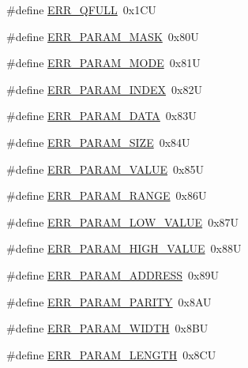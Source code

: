 \begin{DoxyCompactItemize}
\item 
\#define \hyperlink{group___p_e___error__module_gad65300b536c4165d469701d5db712cd0}{E\+R\+R\+\_\+\+Q\+F\+U\+LL}~0x1\+CU
\item 
\#define \hyperlink{group___p_e___error__module_ga970a8c8e887512534203a47758618763}{E\+R\+R\+\_\+\+P\+A\+R\+A\+M\+\_\+\+M\+A\+SK}~0x80U
\item 
\#define \hyperlink{group___p_e___error__module_ga82c14ce7730e53556eebd8522e60f7a9}{E\+R\+R\+\_\+\+P\+A\+R\+A\+M\+\_\+\+M\+O\+DE}~0x81U
\item 
\#define \hyperlink{group___p_e___error__module_ga62fe765f9a9f81fab7fda1c66f798460}{E\+R\+R\+\_\+\+P\+A\+R\+A\+M\+\_\+\+I\+N\+D\+EX}~0x82U
\item 
\#define \hyperlink{group___p_e___error__module_gaeb2f60cce36e220acadb18ae558d7fe6}{E\+R\+R\+\_\+\+P\+A\+R\+A\+M\+\_\+\+D\+A\+TA}~0x83U
\item 
\#define \hyperlink{group___p_e___error__module_ga28178b0019131081a20e071b469f8154}{E\+R\+R\+\_\+\+P\+A\+R\+A\+M\+\_\+\+S\+I\+ZE}~0x84U
\item 
\#define \hyperlink{group___p_e___error__module_gab1b9c8e3380ec0d179ca12c15376e87a}{E\+R\+R\+\_\+\+P\+A\+R\+A\+M\+\_\+\+V\+A\+L\+UE}~0x85U
\item 
\#define \hyperlink{group___p_e___error__module_ga41549ae34f9b04ae4999ea6d409e37cd}{E\+R\+R\+\_\+\+P\+A\+R\+A\+M\+\_\+\+R\+A\+N\+GE}~0x86U
\item 
\#define \hyperlink{group___p_e___error__module_gabc89752a87a9f53f321fbab8d09a8ede}{E\+R\+R\+\_\+\+P\+A\+R\+A\+M\+\_\+\+L\+O\+W\+\_\+\+V\+A\+L\+UE}~0x87U
\item 
\#define \hyperlink{group___p_e___error__module_ga9229f7ed87a3c19d767a531f64878de4}{E\+R\+R\+\_\+\+P\+A\+R\+A\+M\+\_\+\+H\+I\+G\+H\+\_\+\+V\+A\+L\+UE}~0x88U
\item 
\#define \hyperlink{group___p_e___error__module_ga74cd838ca304eac3802e330625e40eaf}{E\+R\+R\+\_\+\+P\+A\+R\+A\+M\+\_\+\+A\+D\+D\+R\+E\+SS}~0x89U
\item 
\#define \hyperlink{group___p_e___error__module_ga00e4ff0963dd709271c3ec8a56bf5611}{E\+R\+R\+\_\+\+P\+A\+R\+A\+M\+\_\+\+P\+A\+R\+I\+TY}~0x8\+AU
\item 
\#define \hyperlink{group___p_e___error__module_ga11fd34b18ad64242e823cd535b660d66}{E\+R\+R\+\_\+\+P\+A\+R\+A\+M\+\_\+\+W\+I\+D\+TH}~0x8\+BU
\item 
\#define \hyperlink{group___p_e___error__module_ga14b3e7ce45de757b62ed57b6943e2172}{E\+R\+R\+\_\+\+P\+A\+R\+A\+M\+\_\+\+L\+E\+N\+G\+TH}~0x8\+CU

\end{DoxyCompactItemize}
